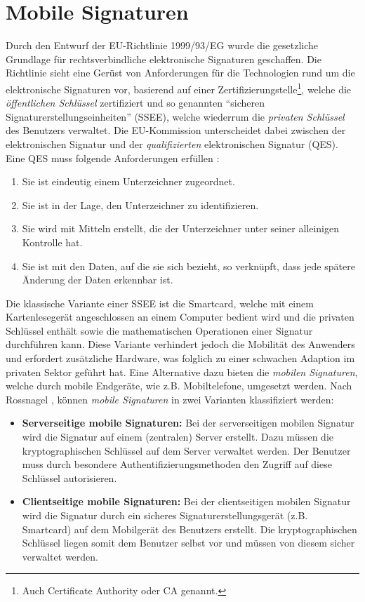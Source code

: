 \documentclass[11pt,a4paper,ngerman]{report}
\begin{document}
\section{Mobile Signaturen}\label{sec:MobileSignaturen}
Durch den Entwurf der EU-Richtlinie 1999/93/EG wurde die gesetzliche Grundlage für rechtsverbindliche elektronische Signaturen geschaffen. Die Richtlinie sieht eine Gerüst von Anforderungen für die Technologien rund um die elektronische Signaturen vor, basierend auf einer Zertifizierungstelle\footnote{Auch Certificate Authority oder CA genannt.}, welche die \textit{öffentlichen Schlüssel} zertifiziert und so genannten ``sicheren Signaturerstellungseinheiten'' (SSEE), welche wiederrum die \textit{privaten Schlüssel} des Benutzers verwaltet. Die EU-Kommission unterscheidet dabei zwischen der elektronischen Signatur und der \textit{qualifizierten} elektronischen Signatur (QES). Eine QES muss folgende Anforderungen erfüllen \cite{eSigEU99}:
\begin{enumerate}
    \item Sie ist eindeutig einem Unterzeichner zugeordnet.
    \item Sie ist in der Lage, den Unterzeichner zu identifizieren.
    \item Sie wird mit Mitteln erstellt, die der Unterzeichner unter seiner alleinigen Kontrolle hat.
    \item Sie ist mit den Daten, auf die sie sich bezieht, so verknüpft, dass jede spätere Änderung der Daten erkennbar ist.
\end{enumerate}
Die klassische Variante einer SSEE ist die Smartcard, welche mit einem Kartenlesegerät angeschlossen an einem Computer bedient wird und die privaten Schlüssel enthält sowie die mathematischen Operationen einer Signatur durchführen kann. Diese Variante verhindert jedoch die Mobilität des Anwenders und erfordert zusätzliche Hardware, was folglich zu einer schwachen Adaption im privaten Sektor geführt hat. Eine Alternative dazu bieten die \textit{mobilen Signaturen}, welche durch mobile Endgeräte, wie z.B. Mobiltelefone, umgesetzt werden. Nach Rossnagel \cite{rossnagel}, können \textit{mobile Signaturen}   in zwei Varianten klassifiziert werden:
\begin{itemize}
    \item \textbf{Serverseitige mobile Signaturen:} Bei der serverseitigen mobilen Signatur wird die Signatur auf einem (zentralen) Server erstellt. Dazu müssen die kryptographischen Schlüssel auf dem Server verwaltet werden. Der Benutzer muss durch besondere Authentifizierungsmethoden den Zugriff auf diese Schlüssel autorisieren.
    \item \textbf{Clientseitige mobile Signaturen:} Bei der clientseitigen mobilen Signatur wird die Signatur durch ein sicheres Signaturerstellungsgerät (z.B. Smartcard) auf dem Mobilgerät des Benutzers erstellt. Die kryptographischen Schlüssel liegen somit dem Benutzer selbst vor und müssen von diesem sicher verwaltet werden.
\end{itemize}
\end{document}
